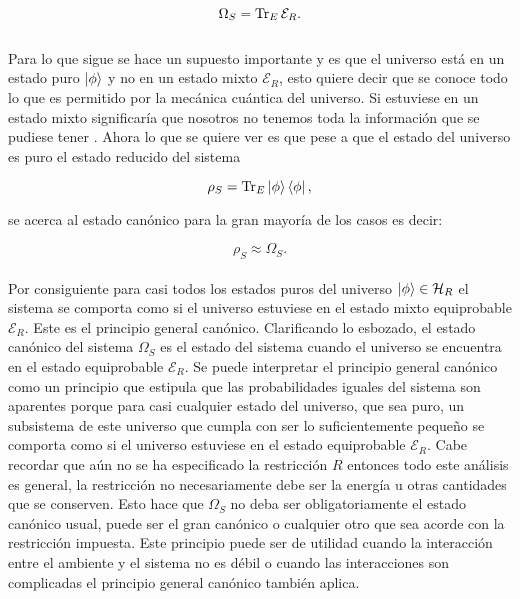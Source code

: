 \begin{equation}
 \Omega_{S} =\Tr_{E} \mathcal{E}_{R}.
\end{equation}
\\
Para lo que sigue se hace un supuesto importante  y es que el universo está en un estado puro $\ket{\phi}$ y no en un estado mixto $\mathcal{E}_{R}$, esto quiere decir que se conoce todo lo que es permitido por la mecánica cuántica del universo. Si estuviese en un estado mixto significaría que nosotros no tenemos toda la información que se pudiese tener \cite{SakuraiQuantum}. Ahora lo que se quiere ver es que  pese a que el estado del universo es puro el estado reducido del sistema

\begin{equation}
\rho_{S}=\Tr_{E}\ket{\phi}\bra{\phi},
\end{equation}

se acerca al estado canónico para la gran mayoría de los casos es decir:

\begin{equation}
\rho_{S} \approx \Omega_{S}.
\end{equation}
\\
Por consiguiente para casi todos los estados puros del universo $\ket{\phi} \in \mathcal{H}_{R}$ el sistema se comporta como si el universo estuviese en el estado mixto equiprobable $\mathcal{E}_{R}$. Este  es el principio general canónico. Clarificando lo esbozado, el estado canónico del sistema $\Omega_{S}$ es el estado del sistema cuando el universo se encuentra en el estado equiprobable $\mathcal{E}_{R}$. Se puede interpretar el principio general canónico como un principio que estipula que las probabilidades iguales del sistema son aparentes porque para casi cualquier estado del universo, que sea puro, un subsistema de este universo que cumpla con ser lo suficientemente pequeño se comporta como si el universo estuviese en el estado equiprobable $\mathcal{E}_{R}$. Cabe recordar que aún no se ha especificado la restricción $R$ entonces todo este análisis es general, la restricción no necesariamente debe ser la energía u otras cantidades que se conserven. Esto hace que $\Omega_{S}$ no  deba ser obligatoriamente el estado canónico usual, puede ser el gran canónico o cualquier otro que sea acorde con la restricción impuesta\cite{ReichlStat}. Este principio puede ser de utilidad cuando la interacción entre el ambiente y el sistema no es débil o cuando las interacciones son complicadas el principio general canónico también aplica.

